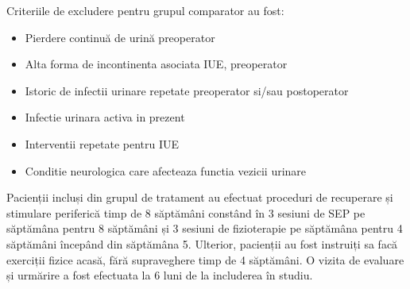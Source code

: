 \documentclass[12pt]{article}
\begin{document}
  Criteriile de excludere pentru grupul comparator au fost:
  \begin{itemize}
    \item Pierdere continuă de urină preoperator
    \item Alta forma de incontinenta asociata IUE, preoperator
    \item Istoric de infectii urinare repetate preoperator si/sau postoperator
    \item Infectie urinara activa in prezent
    \item Interventii repetate pentru IUE
    \item Conditie neurologica care afecteaza functia vezicii urinare
 \end{itemize}
   
  Pacienții incluși din grupul de tratament au efectuat proceduri de recuperare și stimulare periferică timp de 8 săptămâni constând în 3 sesiuni de \ac{SEP} pe săptămâna pentru 8 săptămâni și 3 sesiuni de fizioterapie pe săptămâna pentru 4 săptămâni începând din săptămâna 5. Ulterior, pacienții au fost instruiți sa facă exerciții fizice acasă, fără supraveghere timp de 4 săptămâni. O vizita de evaluare și urmărire a fost efectuata la 6 luni de la includerea în studiu.
  
\end{document}
